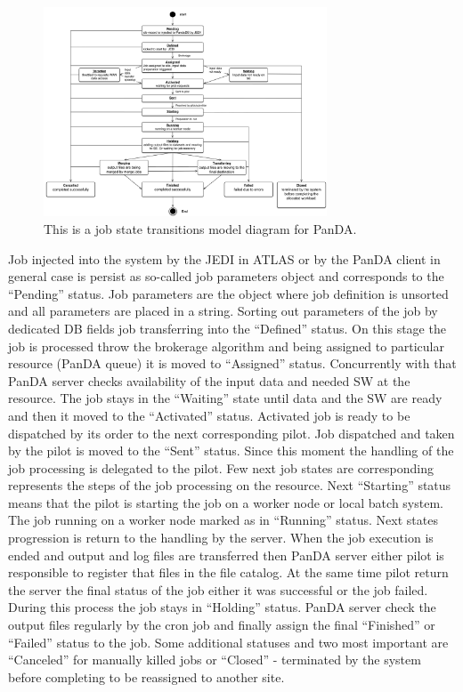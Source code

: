 \begin{figure}
  \includegraphics[width=0.75\textwidth]{images/job-state-diagram.png}
\caption{This is a job state transitions model diagram for PanDA.}
\label{fig:jobstates}
\end{figure}

Job injected into the system by the JEDI in ATLAS or by the PanDA client in
general case is persist as so-called job parameters object and corresponds to
the ``Pending'' status. Job parameters are the object where job definition is
unsorted and all parameters are placed in a string. Sorting out parameters of
the job by dedicated DB fields job transferring into the ``Defined'' status.
On this stage the job is processed throw the brokerage algorithm and being
assigned to particular resource (PanDA queue) it is moved to ``Assigned''
status. Concurrently with that PanDA server checks availability of the input
data and needed SW at the resource. The job stays in the ``Waiting'' state
until data and the SW are ready and then it moved to the ``Activated''
status. Activated job is ready to be dispatched by its order to the next
corresponding pilot. Job dispatched and taken by the pilot is moved to the
``Sent'' status. Since this moment the handling of the job processing is
delegated to the pilot. Few next job states are corresponding represents the
steps of the job processing on the resource. Next ``Starting'' status means
that the pilot is starting the job on a worker node or local batch system.
The job running on a worker node marked as in ``Running'' status. Next states
progression is return to the handling by the server. When the job execution
is ended and output and log files are transferred then PanDA server either
pilot is responsible to register that files in the file catalog. At the same
time pilot return the server the final status of the job either it was
successful or the job failed. During this process the job stays in
``Holding'' status. PanDA server check the output files regularly by the cron
job and finally assign the final ``Finished'' or ``Failed'' status to the
job. Some additional statuses and two most important are ``Canceled'' for
manually killed jobs or ``Closed'' - terminated by the system before
completing to be reassigned to another site.

